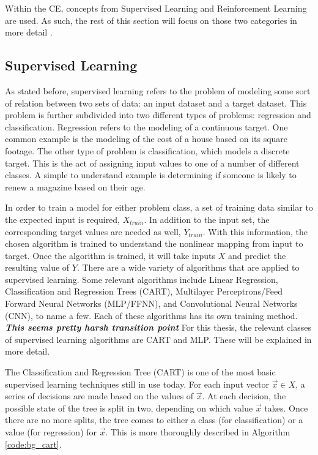 	\par Within the CE, concepts from Supervised Learning and Reinforcement Learning are used. As such, the rest of this section will focus on those two categories in more detail \cite{placeholderCitation}. 
	\subsection{Supervised Learning}
	\par As stated before, supervised learning refers to the problem of modeling some sort of relation between two sets of data: an input dataset and a target dataset. This problem is further subdivided into two different types of problems: regression and classification. Regression refers to the modeling of a continuous target. One common example is the modeling of the cost of a house based on its square footage. The other type of problem is classification, which models a discrete target. This is the act of assigning input values to one of a number of different classes. A simple to understand example is determining if someone is likely to renew a magazine based on their age.  
	\par In order to train a model for either problem class, a set of training data similar to the expected input is required, $X_{train}$. In addition to the input set, the corresponding target values are needed as well, $Y_{train}$. With this information, the chosen algorithm is trained to understand the nonlinear mapping from input to target. Once the algorithm is trained, it will take inputs $X$ and predict the resulting value of $Y$. There are a wide variety of algorithms that are applied to supervised learning. Some relevant algorithms include Linear Regression, Classification and Regression Trees (CART), Multilayer Perceptrons/Feed Forward Neural Networks (MLP/FFNN), and Convolutional Neural Networks (CNN), to name a few. Each of these algorithms has its own training method. \textbf{\textit{This seems pretty harsh transition point}} For this thesis, the relevant classes of supervised learning algorithms are CART and MLP. These will be explained in more detail.
	\par The Classification and Regression Tree (CART) is one of the most basic supervised learning techniques still in use today. For each input vector $\vec{x} \in X$, a series of decisions are made based on the values of $\vec{x}$. At each decision, the possible state of the tree is split in two, depending on which value $\vec{x}$ takes. Once there are no more splits, the tree comes to either a class (for classification) or a value (for regression) for $\vec{x}$. This is more thoroughly described in Algorithm \ref{code:bg_cart}.
